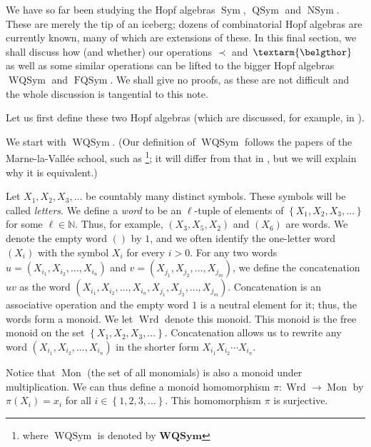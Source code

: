 \documentclass
[numbers=enddot,12pt,final,onecolumn,notitlepage,abstracton]{scrartcl}%
\theoremstyle{definition}
\newcommand{\bel}{\left. \textarm{\belgthor} \right.}
\begin{document}
We have so far been studying the Hopf algebras $\operatorname*{Sym}$,
$\operatorname*{QSym}$ and $\operatorname*{NSym}$. These are merely the tip of
an iceberg; dozens of combinatorial Hopf algebras are currently known, many of
which are extensions of these. In this final section, we shall discuss how
(and whether) our operations $\left.  \prec\right.  $ and $\bel $ as well as
some similar operations can be lifted to the bigger Hopf algebras
$\operatorname*{WQSym}$ and $\operatorname*{FQSym}$. We shall give no proofs,
as these are not difficult and the whole discussion is tangential to this note.

Let us first define these two Hopf algebras (which are discussed, for example,
in \cite{FM}).

We start with $\operatorname*{WQSym}$. (Our definition of
$\operatorname*{WQSym}$ follows the papers of the Marne-la-Vall\'{e}e school,
such as \cite[Section 5.1]{AFNT}\footnote{where $\operatorname*{WQSym}$ is
denoted by $\mathbf{WQSym}$}; it will differ from that in \cite{FM}, but we
will explain why it is equivalent.)

Let $X_{1},X_{2},X_{3},\ldots$ be countably many distinct symbols. These
symbols will be called \textit{letters}. We define a \textit{word} to be an
$\ell$-tuple of elements of $\left\{  X_{1},X_{2},X_{3},\ldots\right\}  $ for
some $\ell\in\mathbb{N}$. Thus, for example, $\left(  X_{3},X_{5}%
,X_{2}\right)  $ and $\left(  X_{6}\right)  $ are words. We denote the empty
word $\left(  {}\right)  $ by $1$, and we often identify the one-letter word
$\left(  X_{i}\right)  $ with the symbol $X_{i}$ for every $i>0$. For any two
words $u=\left(  X_{i_{1}},X_{i_{2}},\ldots,X_{i_{n}}\right)  $ and $v=\left(
X_{j_{1}},X_{j_{2}},\ldots,X_{j_{m}}\right)  $, we define the concatenation
$uv$ as the word \newline$\left(  X_{i_{1}},X_{i_{2}},\ldots,X_{i_{n}%
},X_{j_{1}},X_{j_{2}},\ldots,X_{j_{m}}\right)  $. Concatenation is an
associative operation and the empty word $1$ is a neutral element for it;
thus, the words form a monoid. We let $\operatorname*{Wrd}$ denote this
monoid. This monoid is the free monoid on the set $\left\{  X_{1},X_{2}%
,X_{3},\ldots\right\}  $. Concatenation allows us to rewrite any word $\left(
X_{i_{1}},X_{i_{2}},\ldots,X_{i_{n}}\right)  $ in the shorter form $X_{i_{1}%
}X_{i_{2}}\cdots X_{i_{n}}$.

Notice that $\operatorname*{Mon}$ (the set of all monomials) is also a monoid
under multiplication. We can thus define a monoid homomorphism $\pi
:\operatorname*{Wrd}\rightarrow\operatorname*{Mon}$ by $\pi\left(
X_{i}\right)  =x_{i}$ for all $i\in\left\{  1,2,3,\ldots\right\}  $. This
homomorphism $\pi$ is surjective.
\end{document}
